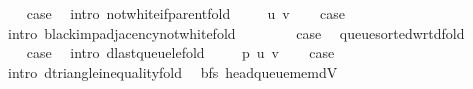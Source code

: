 \begin{isabellebody}
\ \ \isamarkupfalse%
\ {\isacharquery}{\kern0pt}case\ \isamarkupfalse%
\ {\isacharparenleft}{\kern0pt}intro\ not{\isacharunderscore}{\kern0pt}white{\isacharunderscore}{\kern0pt}if{\isacharunderscore}{\kern0pt}parent{\isacharunderscore}{\kern0pt}fold{\isacharparenright}{\kern0pt}\isanewline
{}\isamarkupfalse%
\isanewline
\ \ \isamarkupfalse%
\ {\isacharparenleft}{\kern0pt}{}\ u\ v{\isacharparenright}{\kern0pt}\isanewline
\ \ \isamarkupfalse%
\ {\isacharquery}{\kern0pt}case\ \isamarkupfalse%
\ {\isacharparenleft}{\kern0pt}intro\ black{\isacharunderscore}{\kern0pt}imp{\isacharunderscore}{\kern0pt}adjacency{\isacharunderscore}{\kern0pt}not{\isacharunderscore}{\kern0pt}white{\isacharunderscore}{\kern0pt}fold{\isacharparenright}{\kern0pt}\isanewline
{}\isamarkupfalse%
\isanewline
\ \ \isamarkupfalse%
\ {}\isanewline
\ \ \isamarkupfalse%
\ {\isacharquery}{\kern0pt}case\ \isamarkupfalse%
\ queue{\isacharunderscore}{\kern0pt}sorted{\isacharunderscore}{\kern0pt}wrt{\isacharunderscore}{\kern0pt}d{\isacharunderscore}{\kern0pt}fold\ \isacommand{{\isachardot}{\kern0pt}}\isamarkupfalse%
\isanewline
{}\isamarkupfalse%
\isanewline
\ \ \isamarkupfalse%
\ {}{}\isanewline
\ \ \isamarkupfalse%
\ {\isacharquery}{\kern0pt}case\ \isamarkupfalse%
\ {\isacharparenleft}{\kern0pt}intro\ d{\isacharunderscore}{\kern0pt}last{\isacharunderscore}{\kern0pt}queue{\isacharunderscore}{\kern0pt}le{\isacharunderscore}{\kern0pt}fold{\isacharparenright}{\kern0pt}\isanewline
{}\isamarkupfalse%
\isanewline
\ \ \isamarkupfalse%
\ {\isacharparenleft}{\kern0pt}{}{}\ p\ u\ v{\isacharparenright}{\kern0pt}\isanewline
\ \ \isamarkupfalse%
\ {\isacharquery}{\kern0pt}case\ \isamarkupfalse%
\ {\isacharparenleft}{\kern0pt}intro\ d{\isacharunderscore}{\kern0pt}triangle{\isacharunderscore}{\kern0pt}inequality{\isacharunderscore}{\kern0pt}fold{\isacharparenright}{\kern0pt}\isanewline
{}\isamarkupfalse%
%
\endisatagproof
{\isafoldproof}%
%
\isadelimproof
\isanewline
%
\endisadelimproof
%
\isadeliminvisible
\isanewline
%
\endisadeliminvisible
%
\isataginvisible
{}\isamarkupfalse%
\ {\isacharparenleft}{\kern0pt}\ bfs{\isacharparenright}{\kern0pt}\ head{\isacharunderscore}{\kern0pt}queue{\isacharunderscore}{\kern0pt}mem{\isacharunderscore}{\kern0pt}dV{\isacharcolon}{\kern0pt}\isanewline

\end{isabellebody}
